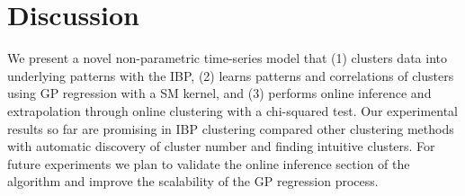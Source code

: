 \documentclass{article}
\begin{document}
\section{Discussion}

We present a novel non-parametric time-series model that (1) clusters data into underlying patterns with the IBP, (2) learns patterns and correlations of clusters using GP regression with a SM kernel, and (3) performs online inference and extrapolation through online clustering with a chi-squared test. Our experimental results so far are promising in IBP clustering compared other clustering methods with automatic discovery of cluster number and finding intuitive clusters. For future experiments we plan to validate the online inference section of the algorithm and improve the scalability of the GP regression process.



\end{document}

